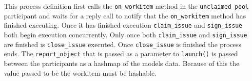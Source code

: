 \documentclass[document.tex]{subfiles}
\begin{document}
This process definition first calls the \verb!on_workitem! method in the \verb!unclaimed_pool! participant and waits for a reply call to notify that the \verb!on_workitem! method has finished executing. Once it has finished execution \verb!claim_issue! and \verb!sign_issue! both begin execution concurrently. Only once both \verb!claim_issue! and \verb!sign_issue! are finished is \verb!close_issue! executed. Once \verb!close_issue! is finished the process ends. The \verb!report_object! that is passed as a parameter to \verb!launch()! is passed between the participants as a hashmap of the models data. Because of this the value passed to be the workitem must be hashable.
\end{document}
